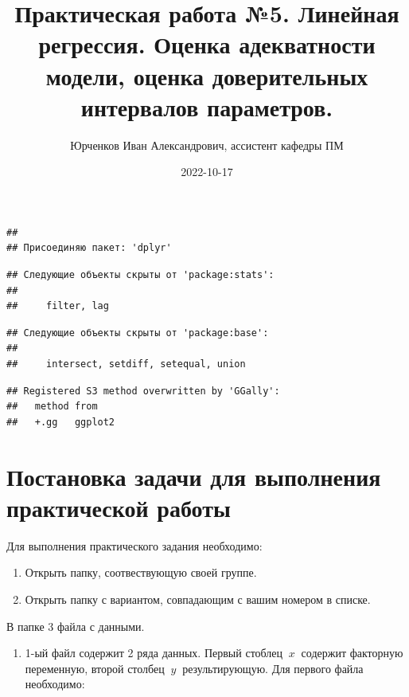 \documentclass[
]{article}
\title{Практическая работа №5. Линейная регрессия. Оценка адекватности
модели, оценка доверительных интервалов параметров.}
\author{Юрченков Иван Александрович, ассистент кафедры ПМ}
\date{2022-10-17}
\providecommand{\tightlist}{%
  \setlength{\itemsep}{0pt}\setlength{\parskip}{0pt}}
\begin{document}
\maketitle

\begin{verbatim}
## 
## Присоединяю пакет: 'dplyr'
\end{verbatim}

\begin{verbatim}
## Следующие объекты скрыты от 'package:stats':
## 
##     filter, lag
\end{verbatim}

\begin{verbatim}
## Следующие объекты скрыты от 'package:base':
## 
##     intersect, setdiff, setequal, union
\end{verbatim}

\begin{verbatim}
## Registered S3 method overwritten by 'GGally':
##   method from   
##   +.gg   ggplot2
\end{verbatim}

\hypertarget{ux43fux43eux441ux442ux430ux43dux43eux432ux43aux430-ux437ux430ux434ux430ux447ux438-ux434ux43bux44f-ux432ux44bux43fux43eux43bux43dux435ux43dux438ux44f-ux43fux440ux430ux43aux442ux438ux447ux435ux441ux43aux43eux439-ux440ux430ux431ux43eux442ux44b}{%
\section{\texorpdfstring{\textbf{Постановка задачи для выполнения
практической
работы}}{Постановка задачи для выполнения практической работы}}\label{ux43fux43eux441ux442ux430ux43dux43eux432ux43aux430-ux437ux430ux434ux430ux447ux438-ux434ux43bux44f-ux432ux44bux43fux43eux43bux43dux435ux43dux438ux44f-ux43fux440ux430ux43aux442ux438ux447ux435ux441ux43aux43eux439-ux440ux430ux431ux43eux442ux44b}}

Для выполнения практического задания необходимо:

\begin{enumerate}
\def\labelenumi{\arabic{enumi}.}
\item
  Открыть папку, соотвествующую своей группе.
\item
  Открыть папку с вариантом, совпадающим с вашим номером в списке.
\end{enumerate}

В папке 3 файла с данными.

\begin{enumerate}
\def\labelenumi{\arabic{enumi}.}
\tightlist
\item
  1-ый файл содержит 2 ряда данных. Первый стоблец \(\ x\ \) содержит
  факторную переменную, второй столбец \(\ y\ \) результирующую. Для
  первого файла необходимо:
\end{enumerate}
\end{document}
